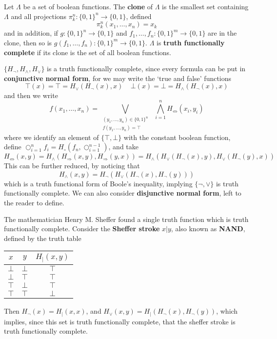 \begin{definition}
    Let $\Lambda$ be a set of boolean functions. The {\bf clone} of $\Lambda$ is the smallest set containing $\Lambda$ and all projections $\pi^n_k : \{ 0, 1 \}^n \to \{ 0, 1 \}$, defined
    \[ \pi^n_k(x_1, \dots, x_n) = x_k \]
    and in addition, if $g: \{ 0, 1 \}^n \to \{ 0, 1 \}$ and $f_1, \dots, f_n : \{ 0, 1 \}^m \to \{ 0, 1 \}$ are in the clone, then so is $g(f_1, \dots, f_n): \{ 0, 1 \}^m \to \{ 0, 1 \}$. $\Lambda$ is {\bf truth functionally complete} if its clone is the set of all boolean functions.
\end{definition}

\begin{example}
    $\{ H_\neg, H_\wedge, H_\vee \}$ is a truth functionally complete, since every formula can be put in {\bf conjunctive normal form}, for we may write the `true and false' functions
    \[ \top(x) = \top = H_\vee(H_\neg(x), x)\ \ \ \ \ \bot(x) = \bot = H_\wedge(H_\neg(x), x) \]
    and then we write
    \[ f(x_1, \dots, x_n) = \bigvee_{\substack{(y_1, \dots, y_n) \in \{ 0, 1 \}^n\\f(y_1, \dots, y_n) = \top}}\ \  \bigwedge_{i = 1}^n H_\Leftrightarrow(x_i, y_i) \]
    where we identify an element of $\{ \top, \bot \}$ with the constant boolean function, define $\bigcirc_{i = 1}^n f_i = H_\circ(f_n, \bigcirc_{i = 1}^{n-1})$, and take
    \[ H_\Leftrightarrow(x,y) = H_\wedge(H_\Rightarrow(x,y), H_\Rightarrow(y,x)) = H_\wedge(H_\vee(H_\neg(x), y), H_\vee(H_\neg(y), x)) \]
    This can be further reduced, by noticing that
    \[ H_\wedge(x,y) = H_\neg(H_\vee(H_\neg(x), H_\neg(y))) \]
    which is a truth functional form of Boole's inequality, implying $\{ \neg, \vee \}$ is truth functionally complete. We can also consider {\bf disjunctive normal form}, left to the reader to define.
\end{example}

\begin{example}
    The mathematician Henry M. Sheffer found a single truth function which is truth functionally complete. Consider the {\bf Sheffer stroke} $x|y$, also known as {\bf NAND}, defined by the truth table
    \begin{center}
    \begin{tabular}{| c | c | c |}
        \hline $x$ & $y$ & $H_|(x,y)$\\
        \hline $\bot$ & $\bot$ & $\top$\\
        $\bot$ & $\top$ & $\top$\\
        $\top$ & $\bot$ & $\top$\\
        $\top$ & $\top$ & $\bot$\\
        \hline
    \end{tabular}
    \end{center}
    Then $H_\neg(x) = H_|(x,x)$, and $H_\vee(x,y) = H_|(H_\neg(x), H_\neg(y))$, which implies, since this set is truth functionally complete, that the sheffer stroke is truth functionally complete.
\end{example}

